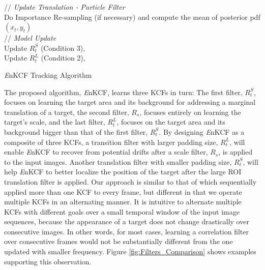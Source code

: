 \documentclass[10pt,twocolumn,letterpaper]{article}
\begin{document}
\begin{algorithm*}[h]
{	// \textit{Update Translation - Particle Filter}\\
	Do Importance Re-sampling (if necessary) and compute the 
	mean of posterior pdf $(x_{t},y_{t})$\\
	// \textit{Model Update}\\
	Update $R_{t}^{S}$ (Condition 3),\\
	Update $R_{t}^{L}$ (Condition 2),\\
  \label{endfor}
}
\caption{{\it E}nKCF Tracking Algorithm}\label{alg:MKCF}
\end{algorithm*}

The proposed algorithm, {\it E}nKCF, learns three KCFs in turn: The
first filter, $R_{t}^{S}$, focuses on learning the target area and its
background for addressing a marginal translation of a target, the
second filter, $R_{s}$, focuses entirely on learning the target's
scale, and the last filter, $R_{t}^{L}$, focuses on the target area
and its background bigger than that of the first filter,
$R_{t}^{S}$. By designing {\it E}nKCF as a composite of three KCFs, a
transition filter with larger padding size, $R_{t}^{L}$, will enable
{\it E}nKCF to recover from potential drifts after a scale filter,
$R_{s}$, is applied to the input images. Another translation filter
with smaller padding size, $R_{t}^{S}$, will help {\it E}nKCF to
better localize the position of the target after the large ROI
translation filter is applied. Our approach is similar to that of
\cite{ma2015long} which sequentially applied more than one KCF to
every frame, but different in that we operate multiple KCFs in an
alternating manner. It is intuitive to alternate multiple KCFs with
different goals over a small temporal window of the input image
sequences, because the appearance of a target does not change
drastically over consecutive images. In other words, for most cases,
learning a correlation filter over consecutive frames would not be
substantially different from the one updated with smaller
frequency. Figure \ref{fig:Filters_Comparison} shows examples
supporting this observation.
\end{document}
